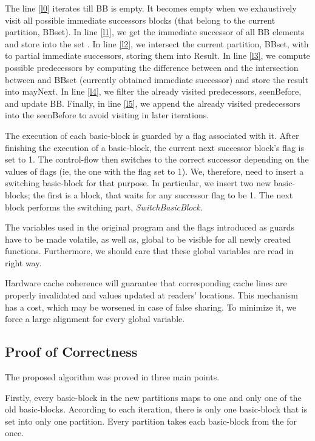 \documentclass[3p,times,procedia,twocolumn,letterpaper]{elsarticle}
\begin{document}
The line \ref{l0} iterates till  BB is empty. It becomes empty when we exhaustively visit all possible immediate successors blocks (that belong to the current partition, BBset). In line \ref{l1}, we get the immediate successor of all BB elements and store into the set . In line \ref{l2}, we intersect the current partition, BBset, with  to partial immediate successors, storing them into Result. In line \ref{l3}, we compute possible predecessors by computing the difference between  and the intersection between  and BBset (currently obtained immediate successor) and store the result into mayNext. In line \ref{l4}, we filter the already visited predecessors, seenBefore, and update BB. Finally, in line \ref{l5}, we append the already visited predecessors into the seenBefore to avoid visiting in later iterations.

The execution of each basic-block is guarded by a flag associated with it. After finishing the execution of a basic-block, the current next successor block's flag is set to 1. The control-flow then switches to the correct successor depending on the values of flags (ie, the one with the flag set to 1). We, therefore, need to insert a switching basic-block for that purpose. In particular, we insert two new basic-blocks; the first is a  block, that waits for any successor flag to be 1. The next block performs the switching part, \emph{SwitchBasicBlock}.

The variables used in the original program and the flags introduced as guards have to be made volatile, as well as, global to be visible for all newly created functions. Furthermore, we should care that these global variables are read in right way.

Hardware cache coherence will guarantee that corresponding cache lines are properly invalidated and values updated at readers' locations. This mechanism has a cost, which may be worsened in case of false sharing. 
 To minimize it, we force a large alignment for every global variable.




\subsection{Proof of Correctness}

The proposed algorithm was proved in three main points.

Firstly, every basic-block in the new partitions maps to one and only one of the old basic-blocks. According to each iteration, there is only one basic-block that is set into only one partition. Every partition takes each basic-block from the  for once.
\end{document}
